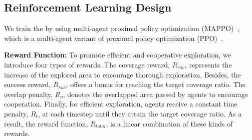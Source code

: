 \subsection{Reinforcement Learning Design}
We train the {\planner} by using multi-agent proximal policy optimization (MAPPO)~\cite{mappo}, which is a multi-agent variant of proximal policy optimization (PPO)~\cite{ppo}.

\textbf{Reward Function: }To promote efficient and cooperative exploration, we introduce four types of rewards. The coverage reward, $R_{cov}$, represents the increase of the explored area to encourage thorough exploration. Besides, the success reward, $R_{suc}$, offers a bonus for reaching the target coverage ratio. The overlap penalty, $R_{o}$, denotes the overlapped area passed by agents to encourage cooperation. Finally, for efficient exploration, agents receive a constant time penalty, $R_{t}$, at each timestep until they attain the target coverage ratio. As a result, the reward function, $R_{total}$, is a linear combination of these kinds of rewards.




